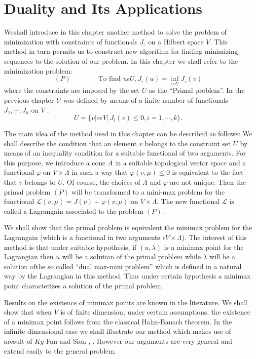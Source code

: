 
\chapter{Duality and Its Applications}\label{chap5}

We\pageoriginale shall introduce in this chapter another method to
solve the problem of minimization with constraints of functionals
$J_{\circ}$ on a Hilbert space $V$. This method in turn permits us to
construct new algorithm for finding minimizing sequences to the
solution of our problem. In this chapter we shall refer to the
minimization problem: 
$$
(P) \qquad\qquad \text{To find } u \epsilon U, J_{\circ}(u) = \inf_{v \epsilon U} J_{\circ}(v)
$$
where the constraints are imposed by the set $U$ as the ``Primal
problem''. In the previous chapter $U$ was defined by means of a
finite number of functionals $J_{1}, \cdots, J_{k}$ on $V$ : 
$$
U = \{v | v \epsilon V; J_{i}(v) \leq 0, i = 1, \cdots, k\}.
$$

The main idea of the method used in this chapter can be described as
follows: We shall describe the condition that an element $v$ belongs
to the constraint set $U$ by means of an inequality condition for a
suitable functional of two arguments. For this purpose, we introduce a
cone $A$ in a suitable topological vector space and a functional
$\varphi$ on $V \times \Lambda$ in such a way that $\varphi(v, \mu)
\leq 0$ is equivalent to the fact that $v$ belongs to $U$. Of course,
the choices of $\Lambda$ and $\varphi$ are not unique. Then the primal
problem $(P)$ will be transformed to a mini-max problem for the
functional $\mathscr{L}(v, \mu) = J(v) + \varphi (v, \mu)$ on $V
\times \Lambda$. The new functional $\mathscr{L}$ is called a
Lagrangain associated to the problem $(P)$. 

We shall show that the primal problem is equivalent the minimax
problem for the Lagrangain (which is a functional in two arguments
$\epsilon V \times \Lambda$). The interest of this method is that
under suitable hypothesis, if $(u, \lambda)$ is a minimax point for
the Lagrangian then $u$ will be a solution of the primal problem while
$\lambda$ will be a solution of\pageoriginale the so called ``dual
max-mini problem'' which is defined in a natural way by the Lagrangian
in this method. Thus under certain hypothesis a minimax point
characterizes a solution of the primal problem. 

Results on the existence of minimax points are known in the
literature. We shall show that when $V$ is of finite dimension, under
certain assumptions, the existence of a minimax point follows from the
classical Hahn-Banach theorem. In the infinite dimensional case we
shall illustrate our method which makes use of aresult of $Ky$ Fan
\cite{key29} and Sion \cite{key41}, \cite{key42}. However our
arguments are very general and extend easily to the general problem. 


